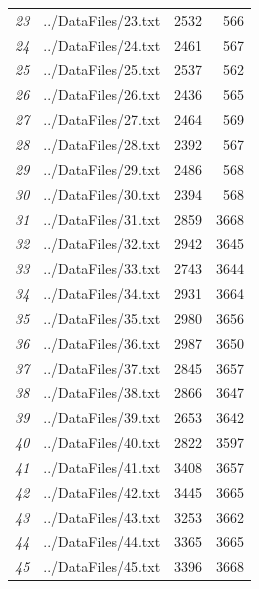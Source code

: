 \documentclass[12pt]{article}
\begin{document}
\begin{table}[ht]
{\begin{tabular}{rlrr}
									{\textit{23}} & ../DataFiles/23.txt & 2532 & 566 \\ 
									{\textit{24}} & ../DataFiles/24.txt & 2461 & 567 \\ 
									{\textit{25}} & ../DataFiles/25.txt & 2537 & 562 \\ 
									{\textit{26}} & ../DataFiles/26.txt & 2436 & 565 \\ 
									{\textit{27}} & ../DataFiles/27.txt & 2464 & 569 \\ 
									{\textit{28}} & ../DataFiles/28.txt & 2392 & 567 \\ 
									{\textit{29}} & ../DataFiles/29.txt & 2486 & 568 \\ 
									{\textit{30}} & ../DataFiles/30.txt & 2394 & 568 \\ 
									{\textit{31}} & ../DataFiles/31.txt & 2859 & 3668 \\ 
									{\textit{32}} & ../DataFiles/32.txt & 2942 & 3645 \\ 
									{\textit{33}} & ../DataFiles/33.txt & 2743 & 3644 \\ 
									{\textit{34}} & ../DataFiles/34.txt & 2931 & 3664 \\ 
									{\textit{35}} & ../DataFiles/35.txt & 2980 & 3656 \\ 
									{\textit{36}} & ../DataFiles/36.txt & 2987 & 3650 \\ 
									{\textit{37}} & ../DataFiles/37.txt & 2845 & 3657 \\ 
									{\textit{38}} & ../DataFiles/38.txt & 2866 & 3647 \\ 
									{\textit{39}} & ../DataFiles/39.txt & 2653 & 3642 \\ 
									{\textit{40}} & ../DataFiles/40.txt & 2822 & 3597 \\ 
									{\textit{41}} & ../DataFiles/41.txt & 3408 & 3657 \\ 
									{\textit{42}} & ../DataFiles/42.txt & 3445 & 3665 \\ 
									{\textit{43}} & ../DataFiles/43.txt & 3253 & 3662 \\ 
									{\textit{44}} & ../DataFiles/44.txt & 3365 & 3665 \\ 
									{\textit{45}} & ../DataFiles/45.txt & 3396 & 3668 \\ 
									\hline
								\end{tabular}
							}
					\end{table}
				\clearpage
\end{document}
